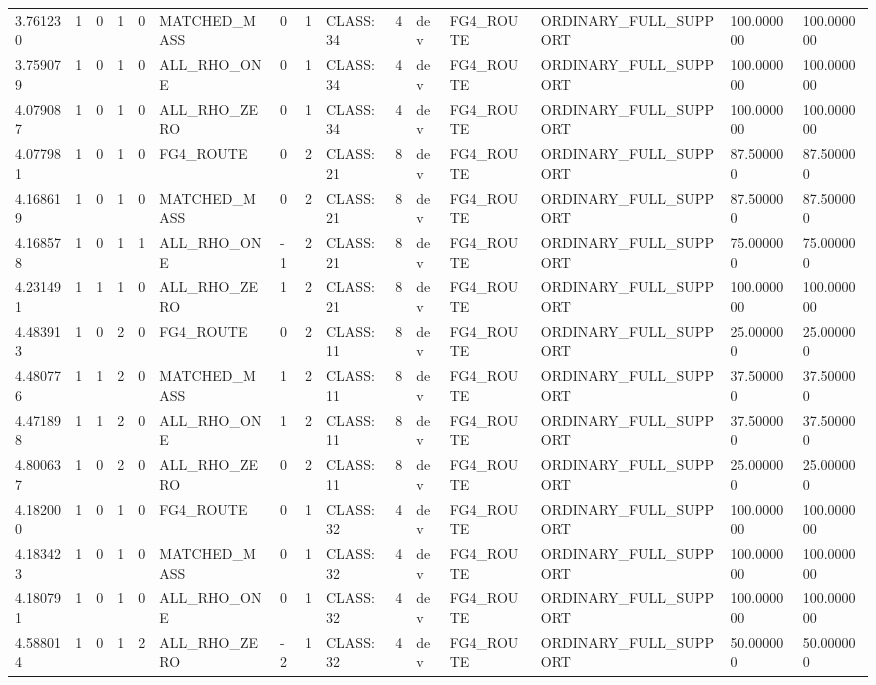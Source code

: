\begin{tabular}{lllllllllllllll}
3.761230 & 1 & 0 & 1 & 0 & MATCHED\_MASS & 0 & 1 & CLASS:34 & 4 & dev & FG4\_ROUTE & ORDINARY\_FULL\_SUPPORT & 100.000000 & 100.000000 \\
3.759079 & 1 & 0 & 1 & 0 & ALL\_RHO\_ONE & 0 & 1 & CLASS:34 & 4 & dev & FG4\_ROUTE & ORDINARY\_FULL\_SUPPORT & 100.000000 & 100.000000 \\
4.079087 & 1 & 0 & 1 & 0 & ALL\_RHO\_ZERO & 0 & 1 & CLASS:34 & 4 & dev & FG4\_ROUTE & ORDINARY\_FULL\_SUPPORT & 100.000000 & 100.000000 \\
4.077981 & 1 & 0 & 1 & 0 & FG4\_ROUTE & 0 & 2 & CLASS:21 & 8 & dev & FG4\_ROUTE & ORDINARY\_FULL\_SUPPORT & 87.500000 & 87.500000 \\
4.168619 & 1 & 0 & 1 & 0 & MATCHED\_MASS & 0 & 2 & CLASS:21 & 8 & dev & FG4\_ROUTE & ORDINARY\_FULL\_SUPPORT & 87.500000 & 87.500000 \\
4.168578 & 1 & 0 & 1 & 1 & ALL\_RHO\_ONE & -1 & 2 & CLASS:21 & 8 & dev & FG4\_ROUTE & ORDINARY\_FULL\_SUPPORT & 75.000000 & 75.000000 \\
4.231491 & 1 & 1 & 1 & 0 & ALL\_RHO\_ZERO & 1 & 2 & CLASS:21 & 8 & dev & FG4\_ROUTE & ORDINARY\_FULL\_SUPPORT & 100.000000 & 100.000000 \\
4.483913 & 1 & 0 & 2 & 0 & FG4\_ROUTE & 0 & 2 & CLASS:11 & 8 & dev & FG4\_ROUTE & ORDINARY\_FULL\_SUPPORT & 25.000000 & 25.000000 \\
4.480776 & 1 & 1 & 2 & 0 & MATCHED\_MASS & 1 & 2 & CLASS:11 & 8 & dev & FG4\_ROUTE & ORDINARY\_FULL\_SUPPORT & 37.500000 & 37.500000 \\
4.471898 & 1 & 1 & 2 & 0 & ALL\_RHO\_ONE & 1 & 2 & CLASS:11 & 8 & dev & FG4\_ROUTE & ORDINARY\_FULL\_SUPPORT & 37.500000 & 37.500000 \\
4.800637 & 1 & 0 & 2 & 0 & ALL\_RHO\_ZERO & 0 & 2 & CLASS:11 & 8 & dev & FG4\_ROUTE & ORDINARY\_FULL\_SUPPORT & 25.000000 & 25.000000 \\
4.182000 & 1 & 0 & 1 & 0 & FG4\_ROUTE & 0 & 1 & CLASS:32 & 4 & dev & FG4\_ROUTE & ORDINARY\_FULL\_SUPPORT & 100.000000 & 100.000000 \\
4.183423 & 1 & 0 & 1 & 0 & MATCHED\_MASS & 0 & 1 & CLASS:32 & 4 & dev & FG4\_ROUTE & ORDINARY\_FULL\_SUPPORT & 100.000000 & 100.000000 \\
4.180791 & 1 & 0 & 1 & 0 & ALL\_RHO\_ONE & 0 & 1 & CLASS:32 & 4 & dev & FG4\_ROUTE & ORDINARY\_FULL\_SUPPORT & 100.000000 & 100.000000 \\
4.588014 & 1 & 0 & 1 & 2 & ALL\_RHO\_ZERO & -2 & 1 & CLASS:32 & 4 & dev & FG4\_ROUTE & ORDINARY\_FULL\_SUPPORT & 50.000000 & 50.000000 \\

\end{tabular}
